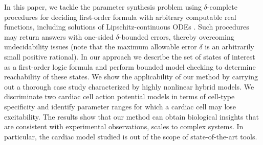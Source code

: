 In this paper, we tackle the parameter synthesis problem using $\delta$-complete procedures \cite{gao12a} 
for deciding first-order formula with arbitrary computable real functions, including solutions 
of Lipschitz-continuous ODEs \citep{gao12b}. Such procedures may return answers with
one-sided $\delta$-bounded errors, thereby overcoming undecidability issues (note that the maximum 
allowable error $\delta$ is an arbitrarily small positive rational). In our approach we describe 
the set of states of interest as a first-order logic formula and perform bounded model checking \cite{BMC}
to determine reachability of these states. %
We show the applicability of our method by carrying out a thorough case study characterized by 
highly nonlinear hybrid models. We discriminate two cardiac cell action potential 
models \cite{fenton98,orovio08} in terms of cell-type specificity and identify parameter ranges for which a cardiac cell may lose excitability.
The results show that our method can obtain biological insights that are consistent with experimental 
observations, scales to complex systems. In particular, the cardiac model studied is out of the scope of 
state-of-the-art tools.
